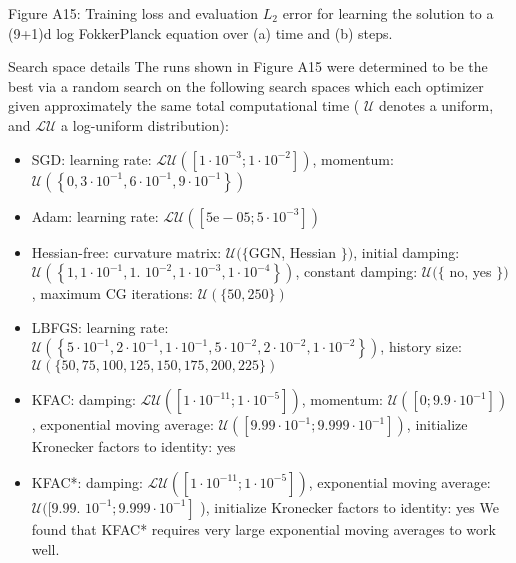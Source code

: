 \documentclass[10pt]{article}
\begin{document}
Figure A15: Training loss and evaluation $L_{2}$ error for learning the solution to a (9+1)d log FokkerPlanck equation over (a) time and (b) steps.

Search space details The runs shown in Figure A15 were determined to be the best via a random search on the following search spaces which each optimizer given approximately the same total computational time ( $\mathcal{U}$ denotes a uniform, and $\mathcal{L U}$ a log-uniform distribution):

\begin{itemize}
  \item SGD: learning rate: $\mathcal{L U}\left(\left[1 \cdot 10^{-3} ; 1 \cdot 10^{-2}\right]\right)$, momentum: $\mathcal{U}\left(\left\{0,3 \cdot 10^{-1}, 6 \cdot 10^{-1}, 9 \cdot 10^{-1}\right\}\right)$
  \item Adam: learning rate: $\mathcal{L U}\left(\left[5 \mathrm{e}-05 ; 5 \cdot 10^{-3}\right]\right)$
  \item Hessian-free: curvature matrix: $\mathcal{U}(\{\mathrm{GGN}$, Hessian $\})$, initial damping: $\mathcal{U}\left(\left\{1,1 \cdot 10^{-1}, 1\right.\right.$. $\left.\left.10^{-2}, 1 \cdot 10^{-3}, 1 \cdot 10^{-4}\right\}\right)$, constant damping: $\mathcal{U}(\{$ no, yes $\})$, maximum CG iterations: $\mathcal{U}(\{50,250\})$
  \item LBFGS: learning rate: $\mathcal{U}\left(\left\{5 \cdot 10^{-1}, 2 \cdot 10^{-1}, 1 \cdot 10^{-1}, 5 \cdot 10^{-2}, 2 \cdot 10^{-2}, 1 \cdot 10^{-2}\right\}\right)$, history size: $\mathcal{U}(\{50,75,100,125,150,175,200,225\})$
  \item KFAC: damping: $\mathcal{L U}\left(\left[1 \cdot 10^{-11} ; 1 \cdot 10^{-5}\right]\right)$, momentum: $\mathcal{U}\left(\left[0 ; 9.9 \cdot 10^{-1}\right]\right)$, exponential moving average: $\mathcal{U}\left(\left[9.99 \cdot 10^{-1} ; 9.999 \cdot 10^{-1}\right]\right)$, initialize Kronecker factors to identity: yes
  \item KFAC*: damping: $\mathcal{L U}\left(\left[1 \cdot 10^{-11} ; 1 \cdot 10^{-5}\right]\right)$, exponential moving average: $\mathcal{U}([9.99$. $\left.10^{-1} ; 9.999 \cdot 10^{-1}\right]$ ), initialize Kronecker factors to identity: yes We found that KFAC* requires very large exponential moving averages to work well.
\end{itemize}
\end{document}
